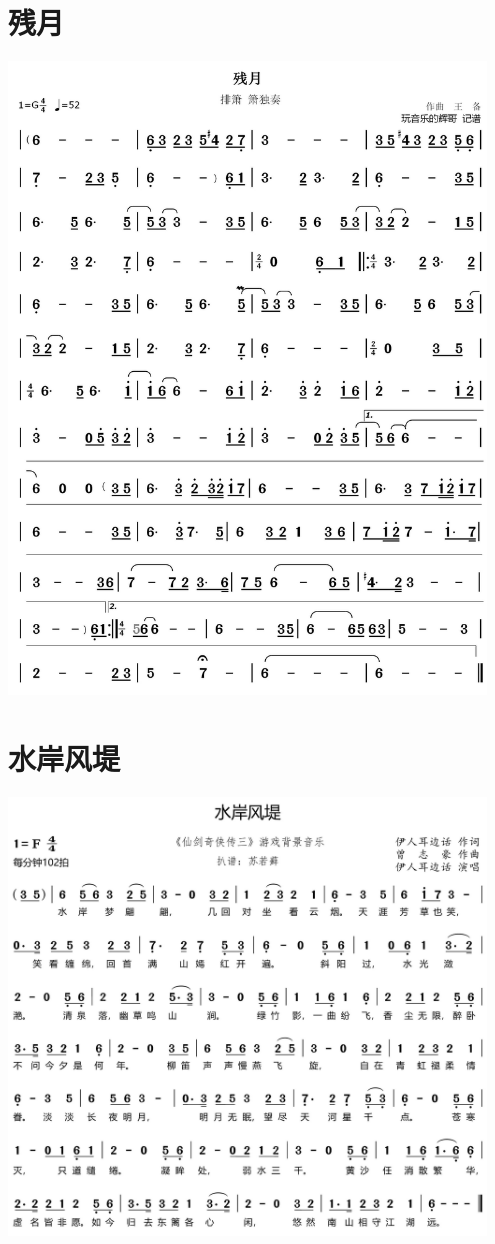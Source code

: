 \documentclass[cn,pad,twocol]{elegantbook}
\begin{document}
\section{残月}
    \includegraphics[width=0.95\textwidth]{dongxiao/20200909-残月.jpg}
\section{水岸风堤}
    \includegraphics[width=0.95\textwidth]{dongxiao/20200909-水岸风堤.jpg}
\end{document}

